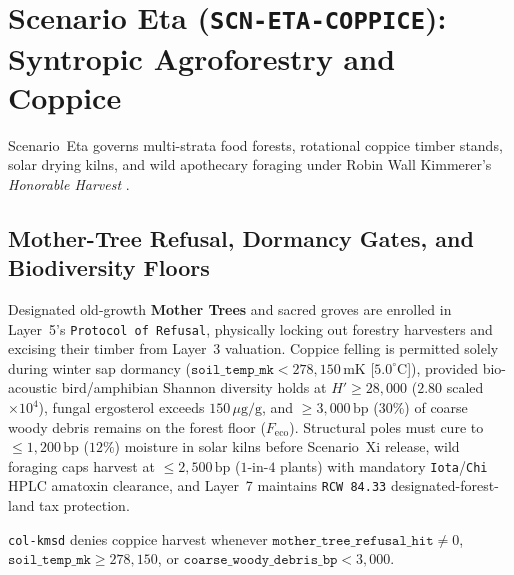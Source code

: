 \section{Scenario Eta (\texttt{SCN-ETA-COPPICE}): Syntropic Agroforestry and Coppice}
\label{sec:waved-eta}

Scenario~Eta governs multi-strata food forests, rotational coppice timber stands, solar drying kilns,
and wild apothecary foraging under Robin Wall Kimmerer's \textit{Honorable Harvest} \parencite{kimmerer2013}.

\subsection{Mother-Tree Refusal, Dormancy Gates, and Biodiversity Floors}

Designated old-growth \textbf{Mother Trees} and sacred groves are enrolled in Layer~5's
\texttt{Protocol of Refusal}, physically locking out forestry harvesters and excising their timber
from Layer~3 valuation. Coppice felling is permitted solely during winter sap dormancy
($\mathtt{soil\_temp\_mk} < 278{,}150\,\mathrm{mK}$ [$5.0^\circ\mathrm{C}$]), provided bio-acoustic
bird/amphibian Shannon diversity holds at $H' \ge 28{,}000$ ($2.80$ scaled $\times 10^4$), fungal
ergosterol exceeds $150\,\mu\mathrm{g/g}$, and $\ge 3{,}000\,\mathrm{bp}$ ($30\%$) of coarse woody
debris remains on the forest floor ($F_{\mathrm{eco}}$). Structural poles must cure to $\le 1{,}200\,\mathrm{bp}$
($12\%$) moisture in solar kilns before Scenario~Xi release, wild foraging caps harvest at $\le 2{,}500\,\mathrm{bp}$
($1$-in-$4$ plants) with mandatory \texttt{Iota}/\texttt{Chi} HPLC amatoxin clearance, and Layer~7
maintains \texttt{RCW 84.33} designated-forest-land tax protection.

\begin{invariant}
\label{inv:waved-eta-forest}
\texttt{col-kmsd} denies coppice harvest whenever $\mathtt{mother\_tree\_refusal\_hit} \ne 0$,
$\mathtt{soil\_temp\_mk} \ge 278{,}150$, or $\mathtt{coarse\_woody\_debris\_bp} < 3{,}000$.
\end{invariant}

